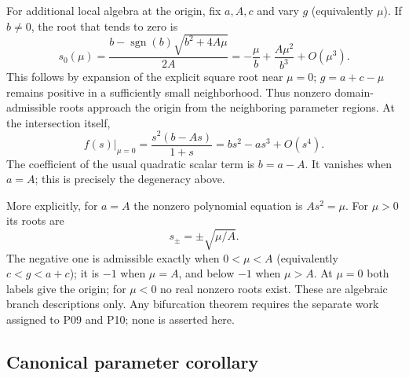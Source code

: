 \documentclass[11pt]{article}
\theoremstyle{definition}
\theoremstyle{remark}
\begin{document}
For additional local algebra at the origin, fix $a,A,c$ and vary $g$
(equivalently $\mu$). If $b\ne0$, the root that tends to zero is
\begin{equation}
\label{eq:P02-local-branch}
 s_0(\mu)=\frac{b-\operatorname{sgn}(b)\sqrt{b^2+4A\mu}}{2A}
        =-\frac{\mu}{b}+\frac{A\mu^2}{b^3}+O(\mu^3).
\end{equation}
This follows by expansion of the explicit square root near $\mu=0$;
$g=a+c-\mu$ remains positive in a sufficiently small neighborhood.
Thus nonzero domain-admissible roots approach the origin from the
neighboring parameter regions. At the intersection itself,
\begin{equation}
\label{eq:P02-quadratic-coefficient}
 f(s)\big|_{\mu=0}=\frac{s^2(b-As)}{1+s}
                     =bs^2-as^3+O(s^4).
\end{equation}
The coefficient of the usual quadratic scalar term is $b=a-A$.
It vanishes when $a=A$; this is precisely the degeneracy above.

More explicitly, for $a=A$ the nonzero polynomial equation is
$As^2=\mu$. For $\mu>0$ its roots are
\begin{equation}
\label{eq:P02-square-root-branches}
 s_\pm=\pm\sqrt{\mu/A}.
\end{equation}
The negative one is admissible exactly when $0<\mu<A$ (equivalently
$c<g<a+c$); it is $-1$ when $\mu=A$, and below $-1$ when $\mu>A$.
At $\mu=0$ both labels give the origin; for $\mu<0$ no real
nonzero roots exist. These are algebraic branch descriptions only.
Any bifurcation theorem requires the separate work assigned to P09
and P10; none is asserted here.

\subsection{Canonical parameter corollary}
\end{document}
